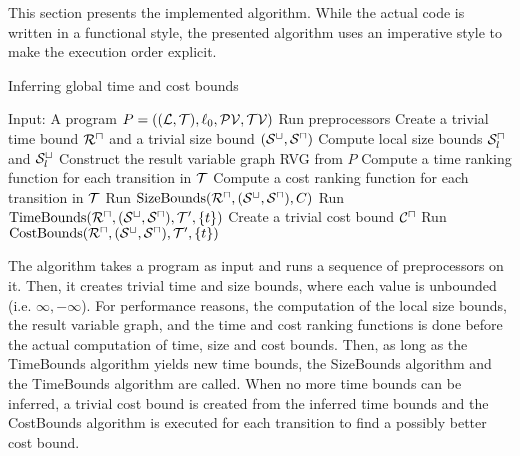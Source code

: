 This section presents the implemented algorithm.
While the actual code is written in a functional style, the presented algorithm uses an imperative style to make the execution order explicit.

\begin{algorithm}
\caption{Inferring global time and cost bounds}\label{complete_algorithm}
\begin{algorithmic}[1]
  \State Input: A program $P = ((\mathcal{L}, \mathcal{T}),\ell_0,\mathcal{PV},\mathcal{TV})$
  \State Run preprocessors
  \State Create a trivial time bound ${\mathcal{R}^\sqcap}$ and a trivial size bound ${({\mathcal{S}^\sqcup}, {\mathcal{S}^\sqcap})}$
  \State Compute local size bounds ${\mathcal{S}^\sqcap_l}$ and ${\mathcal{S}^\sqcup_l}$
  \State Construct the result variable graph RVG from $P$
  \State Compute a time ranking function for each transition in $\mathcal{T}$
  \State Compute a cost ranking function for each transition in $\mathcal{T}$
  \Repeat
      \State Run $\text{SizeBounds}({\mathcal{R}^\sqcap}, {({\mathcal{S}^\sqcup}, {\mathcal{S}^\sqcap})}, C)$
    \EndFor
        \State Run $\text{TimeBounds}({\mathcal{R}^\sqcap}, {({\mathcal{S}^\sqcup}, {\mathcal{S}^\sqcap})}, \mathcal{T}', \lbrace t \rbrace)$
      \EndFor
    \EndFor
  \State Create a trivial cost bound ${\mathcal{C}^\sqcap}$
    \State Run $\text{CostBounds}({\mathcal{R}^\sqcap}, {({\mathcal{S}^\sqcup}, {\mathcal{S}^\sqcap})}, \mathcal{T}', \lbrace t \rbrace)$
  \EndFor
\end{algorithmic}
\end{algorithm}


The algorithm takes a program as input and runs a sequence of preprocessors on it.
Then, it creates trivial time and size bounds, where each value is unbounded (i.e. $\infty, -\infty$).
For performance reasons, the computation of the local size bounds, the result variable graph, and the time and cost ranking functions is done before the actual computation of time, size and cost bounds.
Then, as long as the TimeBounds algorithm yields new time bounds, the SizeBounds algorithm and the TimeBounds algorithm are called.
When no more time bounds can be inferred, a trivial cost bound is created from the inferred time bounds and the CostBounds algorithm is executed for each transition to find a possibly better cost bound.

